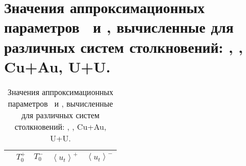 \clearpage
\chapter{Значения аппроксимационных параметров \To \ и \ut, вычисленные для различных систем столкновений: \pal, \heau, Cu+Au, U+U.}\label{app:В}
\begin{table}[]
	\caption{Значения аппроксимационных параметров \To \ и \ut, вычисленные для различных систем столкновений: \pal, \heau, Cu+Au, U+U.}
	\label{table:To_ut}
	
	\begin{tabularx}{\linewidth}
		{
			| >{\centering\arraybackslash}X
			| >{\centering\arraybackslash}X
			| >{\centering\arraybackslash}X
			| >{\centering\arraybackslash}X
			| >{\centering\arraybackslash}X | }
		\hline
		
		\Npart     & $T_{0}^{+}$ & $T_{0}^{-}$  & $\left<u_{t}\right>^{+}$ & $\left<u_{t}\right>^{-}$   \\ \hline
		

\end{tabularx}
\end{table}

